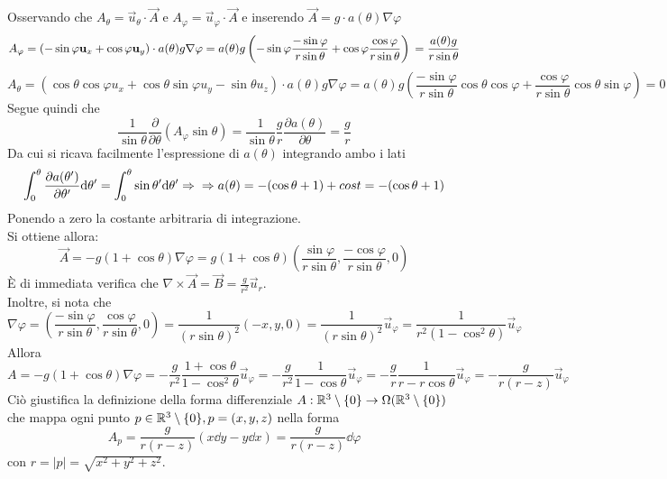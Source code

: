 Osservando che $A_\theta = \vec u _\theta \cdot \vec A $ e
$A_\varphi = \vec u _\varphi \cdot \vec A$ e inserendo $ \vec A = g \cdot a(\theta) \nabla \varphi $
$$
         A_\varphi = (-\sin\varphi \vec u _x + \cos\varphi \vec u _y)
                       \cdot a(\theta) g \nabla \varphi
                = a(\theta)g\left( -\sin\varphi \frac{-\sin\varphi}{r\sin\theta}
                      + \cos\varphi \frac{\cos\varphi}{r\sin\theta}\right)\\
                = \frac{a(\theta)g}{r\sin\theta}
$$
$$         A_\theta = (\cos\theta \cos\varphi u_x + \cos\theta \sin\varphi u_y
                          - \sin\theta u_z) \cdot a(\theta) g \nabla \varphi
                    = a(\theta) g \left( \frac{-\sin\varphi}{r\sin\theta} \cos\theta \cos\varphi
                          + \frac{\cos\varphi}{r\sin\theta} \cos\theta \sin\varphi \right)
                    = 0
$$
Segue quindi che
$$
   \frac{1}{\sin\theta} \frac{\partial}{\partial\theta}(A_\varphi \sin\theta)
      = \frac{1}{\sin\theta} \frac{g}{r} \frac{\partial a(\theta)}{\partial \theta}
      = \frac{g}{r}
$$
Da cui si ricava facilmente l'espressione di $a(\theta)$ integrando ambo i lati
$$
   \int_0 ^\theta \frac{\partial a(\theta')}{\partial \theta'} \dd \theta'
      = \int_0^\theta \sin\theta' \dd \theta' \Rightarrow\\
   \Rightarrow a(\theta) = -(\cos\theta+1) + cost  = -(\cos\theta+1)
$$
Ponendo a zero la costante arbitraria di integrazione.\\
%
Si ottiene allora:
$$
   \boxed{
          \vec A = -g(1 + \cos\theta) \nabla \varphi
                 = g(1 + \cos\theta)\left( \frac{\sin\varphi}{r\sin\theta},
                    \frac{-\cos\varphi}{r\sin\theta},0 \right)
   }
$$
È di immediata verifica che $\nabla \times \vec A = \vec B = \frac{g}{r^2} \vec u _r$.\\
%
Inoltre, si nota che
$$
   \nabla \varphi = \left( \frac{-\sin\varphi}{r\sin\theta},\frac{\cos\varphi}{r\sin\theta},0 \right)
      = \frac{1}{(r\sin\theta)^2}(-x,y,0) = \frac{1}{(r\sin\theta)^2}\vec u _\varphi
      = \frac{1}{r^2(1-\cos^2\theta)} \vec u _\varphi
$$
Allora
$$
   A = -g(1+\cos\theta)\nabla\varphi = -\frac{g}{r^2} \frac{1+\cos\theta}{1-\cos^2\theta} \vec u _\varphi
     = -\frac{g}{r^2} \frac{1}{1-\cos\theta} \vec u _\varphi
     = -\frac{g}{r} \frac{1}{r-r\cos\theta} \vec u _\varphi
     = -\frac{g}{r(r-z)} \vec u _\varphi
$$
Ciò giustifica la definizione della forma differenziale $ A : \R^3 \setminus \{0\}
\to \Omega(\R^3 \setminus \{0\})$ che mappa ogni punto $p \in \R^3 \setminus \{0\} , p = (x,y,z)$ nella forma
$$
    A_p = \frac{g}{r(r-z)}(x \dd  y - y \dd  x) = \frac{g}{r(r-z)} \dd  \varphi
$$
con $r = |p| = \sqrt{x^2+y^2+z^2}$.

